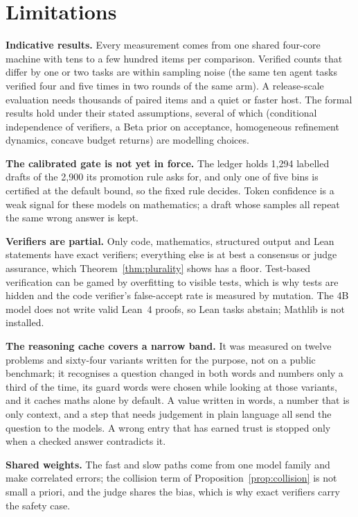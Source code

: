 \section{Limitations}
\label{sec:limits}
\textbf{Indicative results.} Every measurement comes from one shared
four-core machine with tens to a few hundred items per comparison. Verified
counts that differ by one or two tasks are within sampling noise (the same
ten agent tasks verified four and five times in two rounds of the same arm).
A release-scale evaluation needs thousands of paired items and a quiet or
faster host. The formal results hold under their stated assumptions, several
of which (conditional independence of verifiers, a Beta prior on acceptance,
homogeneous refinement dynamics, concave budget returns) are modelling
choices.

\textbf{The calibrated gate is not yet in force.} The ledger holds 1{,}294
labelled drafts of the 2{,}900 its promotion rule asks for, and only one of
five bins is certified at the default bound, so the fixed rule decides. Token confidence is a weak signal for these models on
mathematics; a draft whose samples all repeat the same wrong answer is kept.

\textbf{Verifiers are partial.} Only code, mathematics, structured output and
Lean statements have exact verifiers; everything else is at best a consensus
or judge assurance, which Theorem~\ref{thm:plurality} shows has a floor.
Test-based verification can be gamed by overfitting to visible tests, which is
why tests are hidden and the code verifier's false-accept rate is measured by
mutation. The 4B model does not write valid Lean~4 proofs, so Lean tasks
abstain; Mathlib is not installed.

\textbf{The reasoning cache covers a narrow band.} It was measured on twelve
problems and sixty-four variants written for the purpose, not on a public
benchmark; it recognises a question changed in both words and numbers only a
third of the time, its guard words were chosen while looking at those
variants, and it caches maths alone by default. A value written in words, a
number that is only context, and a step that needs judgement in plain language
all send the question to the models. A wrong entry that has earned trust is
stopped only when a checked answer contradicts it.

\textbf{Shared weights.} The fast and slow paths come from one model family
and make correlated errors; the collision term of
Proposition~\ref{prop:collision} is not small a priori, and the judge shares
the bias, which is why exact verifiers carry the safety case.

